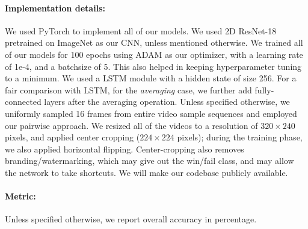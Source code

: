 \documentclass[final]{cvpr}
\begin{document}
\paragraph{Implementation details:} We used PyTorch \cite{pytorch} to implement all of our models. We used 2D ResNet-18 \cite{resnet} pretrained on ImageNet \cite{imagenet} as our CNN, unless mentioned otherwise. We trained all of our models for 100 epochs using ADAM \cite{adam} as our optimizer, with a learning rate of 1e-4, and a batchsize of 5. This also helped in keeping hyperparameter tuning to a minimum. We used a LSTM module with a hidden state of size 256. For a fair comparison with LSTM, for the \textit{averaging} case, we further add fully-connected layers after the averaging operation. Unless specified otherwise, we uniformly sampled 16 frames from entire video sample sequences and employed our pairwise approach. We resized all of the videos to a resolution of $320 \times 240$ pixels, and applied center cropping ($224 \times 224$ pixels); during the training phase, we also applied horizontal flipping. Center-cropping also removes branding/watermarking, which may give out the win/fail class, and may allow the network to take shortcuts. We will make our codebase publicly available.
\paragraph{Metric:} Unless specified otherwise, we report overall accuracy in percentage.
\end{document}
